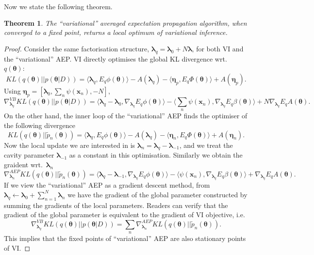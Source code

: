 \documentclass{article} %
\newtheorem{theorem}{Theorem}
\begin{document}
%
Now we state the following theorem. 
%
\begin{theorem}
The ``variational'' averaged expectation propagation algorithm, when converged to a fixed point, returns a local optimum of variational inference.
\end{theorem}
\begin{proof}
Consider the same factorisation structure, $\bm{\lambda}_q = \bm{\lambda}_0 + N \bm{\lambda}$, for both VI and the ``variational'' AEP. VI directly optimises the global KL divergence wrt.~$q(\bm{\theta})$:
\begin{equation}
KL(q(\bm{\theta}) || p(\bm{\theta} | D)) = \langle \bm{\lambda}_q, E_q \phi(\bm{\theta}) \rangle - A(\bm{\lambda}_q) - \langle \bm{\eta}_p, E_q \Phi(\bm{\theta}) \rangle + A(\bm{\eta}_p).
\end{equation}
Using $\bm{\eta}_p = [\bm{\lambda}_0, \sum_{n} \psi(\bm{x}_n), -N]$,
\begin{equation}
\nabla_{\bm{\lambda}_q}^{VB} KL(q(\bm{\theta}) || p(\bm{\theta} | D)) = \langle \bm{\lambda}_q - \bm{\lambda}_0, \nabla_{\bm{\lambda}_q} E_q \phi(\bm{\theta}) \rangle - \langle \sum_{n} \psi(\bm{x}_n), \nabla_{\bm{\lambda}_q} E_q \beta(\bm{\theta}) \rangle + N \nabla_{\bm{\lambda}_q} E_q A(\bm{\theta}).
\end{equation}
On the other hand, the inner loop of the ``variational'' AEP finds the optimiser of the following divergence
\begin{equation}
KL(q(\bm{\theta}) || \tilde{p}_n(\bm{\theta})) = \langle \bm{\lambda}_q, E_q \phi(\bm{\theta}) \rangle - A(\bm{\lambda}_q) - \langle \bm{\eta}_n, E_q \Phi(\bm{\theta}) \rangle + A(\bm{\eta}_n).
\end{equation}
Now the local update we are interested in is $\bm{\lambda}_n = \bm{\lambda}_q - \bm{\lambda}_{-1}$, and we treat the cavity parameter $\bm{\lambda}_{-1}$ as a constant in this optimisation. Similarly we obtain the graident wrt.~$\bm{\lambda}_n$
\begin{equation}
\nabla_{\bm{\lambda}_n}^{AEP} KL(q(\bm{\theta}) || \tilde{p}_n(\bm{\theta})) = \langle \bm{\lambda}_q - \bm{\lambda}_{-1}, \nabla_{\bm{\lambda}_q} E_q \phi(\bm{\theta}) \rangle - \langle \psi(\bm{x}_n), \nabla_{\bm{\lambda}_q} E_q \beta(\bm{\theta}) \rangle +  \nabla_{\bm{\lambda}_q} E_q A(\bm{\theta}).
\end{equation}
If we view the ``variational'' AEP as a gradient descent method, from $\bm{\lambda}_q \leftarrow \bm{\lambda}_0 + \sum_{n=1}^N \bm{\lambda}_n$ we have the gradient of the global parameter constructed by summing the gradients of the local parameters. Readers can verify that the gradient of the global parameter is equivalent to the gradient of VI objective, i.e.
\begin{equation}
\nabla_{\bm{\lambda}_q}^{VB} KL(q(\bm{\theta}) || p(\bm{\theta} | D)) = \sum_n \nabla_{\bm{\lambda}_n}^{AEP} KL(q(\bm{\theta}) || \tilde{p}_n(\bm{\theta})).
\end{equation}
This implies that the fixed points of ``variational'' AEP are also stationary points of VI.
\end{proof}
\end{document}
